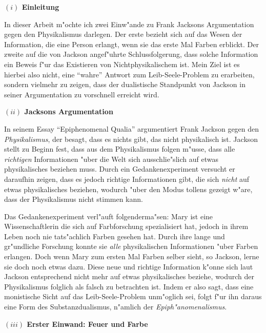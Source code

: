 \documentclass[a4paper, emulatestandardclasses, 12pt]{scrartcl}
\begin{document}
\begin{onehalfspace} 


\noindent\textbf{$(i)$ Einleitung}

\noindent In dieser Arbeit m"ochte ich zwei Einw"ande zu Frank Jacksons Argumentation gegen den Physikalismus darlegen. Der erste bezieht sich auf das Wesen der Information, die eine Person erlangt, wenn sie das erste Mal Farben erblickt. Der zweite auf die von Jackson angef"uhrte Schlussfolgerung, dass solche Information ein Beweis f"ur das Existieren von Nichtphysikalischem ist. Mein Ziel ist es hierbei also nicht, eine "`wahre"' Antwort zum Leib-Seele-Problem zu erarbeiten, sondern vielmehr zu zeigen, dass der dualistische Standpunkt von Jackson in seiner Argumentation zu vorschnell erreicht wird.
\vspace{5mm}

\noindent\textbf{$(ii)$ Jacksons Argumentation}

\noindent In seinem Essay "`Epiphenomenal Qualia"' \citep{jackson1982epiphenomenal} argumentiert Frank Jackson gegen den \emph{Physikalismus}, der besagt, dass es nichts gibt, das nicht physikalisch ist. Jackson stellt zu Beginn fest, dass aus dem Physikalismus folgen m"usse, dass alle \emph{richtigen} Informationen "uber die Welt sich ausschlie"slich auf etwas physikalisches beziehen muss. Durch ein Gedankenexperiment versucht er daraufhin zeigen, dass es jedoch richtige Informationen gibt, die sich \emph{nicht} auf etwas physikalisches beziehen, wodurch "uber den Modus tollens gezeigt w"are, dass der Physikalismus nicht stimmen kann. 

Das Gedankenexperiment verl"auft folgenderma"sen: Mary ist eine Wissenschaftlerin die sich auf Farbforschung spezialisiert hat, jedoch in ihrem Leben noch nie tats"achlich Farben gesehen hat. Durch ihre lange und gr"undliche Forschung konnte sie \emph{alle} physikalischen Informationen "uber Farben erlangen. Doch wenn Mary zum ersten Mal Farben selber sieht, so Jackson, lerne sie doch noch etwas dazu. Diese neue und richtige Information k"onne sich laut Jackson entsprechend nicht mehr auf etwas physikalisches beziehe, wodurch der Physikalismus folglich als falsch zu betrachten ist. Indem er also sagt, dass eine monistische Sicht auf das Leib-Seele-Problem unm"oglich sei, folgt f"ur ihn daraus eine Form des Substanzdualismus, n"amlich der  \emph{Epiph"anomenalismus}.


\vspace{5mm}
\noindent\textbf{$(iii)$ Erster Einwand: Feuer und Farbe}


\end{onehalfspace}
\end{document}
